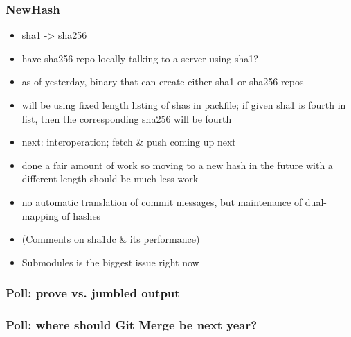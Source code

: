 \documentclass[t]{beamer}
\begin{document}

\begin{frame}
  \frametitle{NewHash}

  \begin{itemize}
    \item sha1 -> sha256
    \item have sha256 repo locally talking to a server using sha1?
    \item as of yesterday, binary that can create either sha1 or sha256 repos
    \item will be using fixed length listing of shas in packfile; if given sha1
      is fourth in list, then the corresponding sha256 will be fourth
    \item next: interoperation; fetch \& push coming up next
    \item done a fair amount of work so moving to a new hash in the future with
      a different length should be much less work
    \item no automatic translation of commit messages, but maintenance of
      dual-mapping of hashes
    \item (Comments on sha1dc \& its performance)
    \item Submodules is the biggest issue right now
  \end{itemize}

\end{frame}


\begin{frame}
  \frametitle{Poll: prove vs. jumbled output}


\end{frame}


\begin{frame}
  \frametitle{Poll: where should Git Merge be next year?}


\end{frame}
\end{document}

